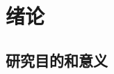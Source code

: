 \documentclass{ctexbook}
\begin{document}
%	
	
	
	
	
	\tableofcontents
	
	\chapter{绪论} %
	\section{研究目的和意义}
\end{document}
